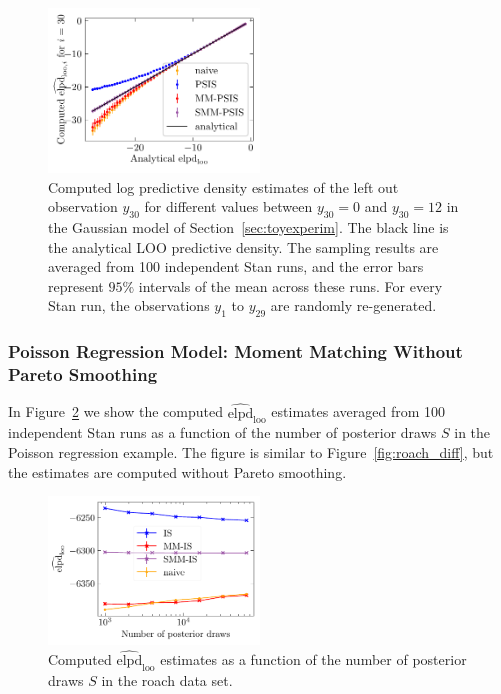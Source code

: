 \documentclass[12pt]{article}
\begin{document}
\begin{figure}[h]
\centering
\includegraphics[width=0.5\textwidth]{figs/normaldata_1_randomized.pdf}
%
\caption{Computed log predictive density estimates of the left out observation $y_{30}$
for different values between $y_{30} = 0$ and $y_{30} = 12$ in the Gaussian model of Section~\ref{sec:toyexperim}.
The black line is the analytical LOO predictive density. The sampling results are averaged from 100 independent Stan runs, and the error bars represent $95 \%$
intervals of the mean across these runs. For every Stan run, the observations $y_{1}$ to $y_{29}$
are randomly re-generated.} \label{fig:toynormal_randomized}
\end{figure}










\subsubsection*{Poisson Regression Model: Moment Matching Without Pareto Smoothing}


In Figure~\ref{fig:roach_diff2} we show the computed $\widehat{\mathrm{elpd}}_{\mathrm{loo}}$
estimates averaged from 100 independent Stan runs as a function of the number of posterior draws $S$
in the Poisson regression example.
The figure is similar to Figure~\ref{fig:roach_diff}, but the
estimates are computed without Pareto smoothing.



\begin{figure}[h]
\centering
\includegraphics[width=0.5\textwidth]{figs/roach_diff2.pdf}
\caption{Computed $\widehat{\mathrm{elpd}}_{\mathrm{loo}}$
estimates as a function of the number of posterior draws $S$
in the roach data set.} \label{fig:roach_diff2}
\end{figure}
\end{document}
